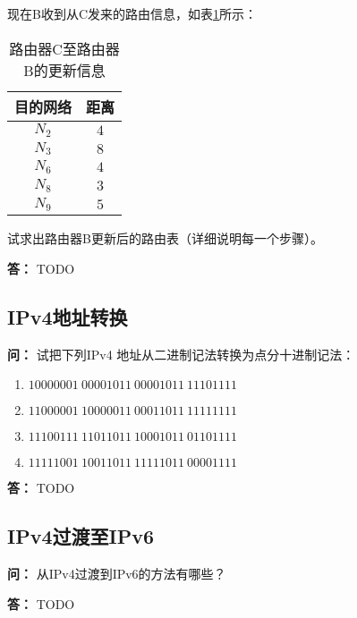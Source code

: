 \documentclass[12pt,hyperref,a4paper,UTF8]{ctexart}
\begin{document}
现在B收到从C发来的路由信息，如表\ref{tab:updates}所示：
\begin{table}[h!]
    \centering
    \caption{路由器C至路由器B的更新信息}
    \begin{tabular}{c|c}
    \toprule
    目的网络 & 距离\\
    \midrule
    $N_2$ & $4$\\
    $N_3$ & $8$\\
    $N_6$ & $4$\\
    $N_8$ & $3$\\
    $N_9$ & $5$\\
    \bottomrule
    \end{tabular}
    \label{tab:updates}
\end{table}

试求出路由器B更新后的路由表（详细说明每一个步骤）。

\textbf{答：}
TODO

\subsection{IPv4地址转换}
\textbf{问：}
试把下列IPv4 地址从二进制记法转换为点分十进制记法：
\begin{enumerate}[label=\Roman*)]
    \item $10000001 \ 00001011 \ 00001011 \ 11101111$
    \item $11000001 \ 10000011 \ 00011011 \ 11111111$
    \item $11100111 \ 11011011 \ 10001011 \ 01101111$
    \item $11111001 \ 10011011 \ 11111011 \ 00001111$
\end{enumerate}

\textbf{答：}
TODO

\subsection{IPv4过渡至IPv6}
\textbf{问：}
从IPv4过渡到IPv6的方法有哪些？

\textbf{答：}
TODO
\end{document}
